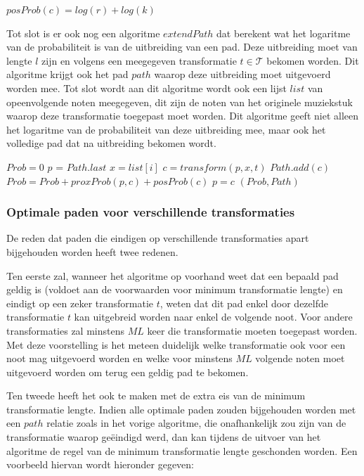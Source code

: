 \begin{framed}
\noindent
$posProb(c)=log(r) + log(k)$
\end{framed}

Tot slot is er ook nog een algoritme $extendPath$ dat berekent wat het logaritme van de probabiliteit is van de uitbreiding van een pad. Deze uitbreiding moet van lengte $l$ zijn en volgens een meegegeven transformatie $t\in \mathcal{T}$ bekomen worden. Dit algoritme krijgt ook het pad $path$ waarop deze uitbreiding moet uitgevoerd worden mee. Tot slot wordt aan dit algoritme wordt ook een lijst $list$ van opeenvolgende noten meegegeven, dit zijn de noten van het originele muziekstuk waarop deze transformatie toegepast moet worden. Dit algoritme geeft niet alleen het logaritme van de probabiliteit van deze uitbreiding mee, maar ook het volledige pad dat na uitbreiding bekomen wordt.

\begin{algorithm}
\caption{$extendPath(l,t,Path,list)$}\label{alg:opt_pad}
\begin{algorithmic}
\State $Prob = 0$
\State $p$ = $Path.last$
	\State $x = list[i]$
	\State $c = transform(p,x,t)$
	\State $Path.add(c)$
	\State $Prob = Prob + proxProb(p,c) + posProb(c)$
	\State $p = c$
\EndFor
\State \Return $(Prob, Path)$ 
\end{algorithmic}
\end{algorithm}

\subsubsection{Optimale paden voor verschillende transformaties}
De reden dat paden die eindigen op verschillende transformaties apart bijgehouden worden heeft twee redenen. 

Ten eerste zal, wanneer het algoritme op voorhand weet dat een bepaald pad geldig is (voldoet aan de voorwaarden voor minimum transformatie lengte) en eindigt op een zeker transformatie $t$, weten dat dit pad enkel door dezelfde transformatie $t$ kan uitgebreid worden naar enkel de volgende noot. Voor andere transformaties zal minstens $ML$ keer die transformatie moeten toegepast worden. Met deze voorstelling is het meteen duidelijk welke transformatie ook voor een noot mag uitgevoerd worden en welke voor minstens $ML$ volgende noten moet uitgevoerd worden om terug een geldig pad te bekomen.

Ten tweede heeft het ook te maken met de extra eis van de minimum transformatie lengte. Indien alle optimale paden zouden bijgehouden worden met een $path$ relatie zoals in het vorige algoritme, die onafhankelijk zou zijn van de transformatie waarop ge\"eindigd werd, dan kan tijdens de uitvoer van het algoritme de regel van de minimum transformatie lengte geschonden worden. Een voorbeeld hiervan wordt hieronder gegeven:

